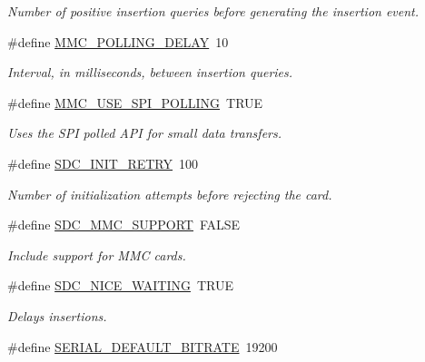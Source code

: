 \begin{DoxyCompactItemize}
\begin{DoxyCompactList}\small\item\em Number of positive insertion queries before generating the insertion event. \end{DoxyCompactList}\item 
\hypertarget{group__HAL__CONF_ga6d164ed93ae233b2dc0c35bd19f75224}{}\#define \hyperlink{group__HAL__CONF_ga6d164ed93ae233b2dc0c35bd19f75224}{M\+M\+C\+\_\+\+P\+O\+L\+L\+I\+N\+G\+\_\+\+D\+E\+L\+A\+Y}~10\label{group__HAL__CONF_ga6d164ed93ae233b2dc0c35bd19f75224}

\begin{DoxyCompactList}\small\item\em Interval, in milliseconds, between insertion queries. \end{DoxyCompactList}\item 
\#define \hyperlink{group__HAL__CONF_ga463aaf38dda5f44ab579ddab0a1cf104}{M\+M\+C\+\_\+\+U\+S\+E\+\_\+\+S\+P\+I\+\_\+\+P\+O\+L\+L\+I\+N\+G}~T\+R\+U\+E
\begin{DoxyCompactList}\small\item\em Uses the S\+P\+I polled A\+P\+I for small data transfers. \end{DoxyCompactList}\item 
\#define \hyperlink{group__HAL__CONF_ga8d39f0c9799062f0698d97c26e6fa42d}{S\+D\+C\+\_\+\+I\+N\+I\+T\+\_\+\+R\+E\+T\+R\+Y}~100
\begin{DoxyCompactList}\small\item\em Number of initialization attempts before rejecting the card. \end{DoxyCompactList}\item 
\#define \hyperlink{group__HAL__CONF_ga4f938eff7370feb8de8411e255d21b01}{S\+D\+C\+\_\+\+M\+M\+C\+\_\+\+S\+U\+P\+P\+O\+R\+T}~F\+A\+L\+S\+E
\begin{DoxyCompactList}\small\item\em Include support for M\+M\+C cards. \end{DoxyCompactList}\item 
\#define \hyperlink{group__HAL__CONF_ga3391c832c171a8606b0fc864766f08ba}{S\+D\+C\+\_\+\+N\+I\+C\+E\+\_\+\+W\+A\+I\+T\+I\+N\+G}~T\+R\+U\+E
\begin{DoxyCompactList}\small\item\em Delays insertions. \end{DoxyCompactList}\item 
\#define \hyperlink{group__HAL__CONF_gacb4c08ac23f83ac9d58c50ff840de516}{S\+E\+R\+I\+A\+L\+\_\+\+D\+E\+F\+A\+U\+L\+T\+\_\+\+B\+I\+T\+R\+A\+T\+E}~19200

\end{DoxyCompactItemize}
